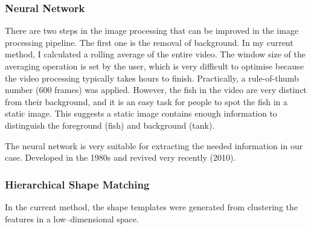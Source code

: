 \documentclass[11pt,twoside]{report}
\begin{document}
\subsubsection{Neural Network}

There are two steps in the image processing that can be improved in the image processing pipeline. The first one is the removal of background. In my current method, I calculated a rolling average of the entire video. The window size of the averaging operation is set by the user, which is very difficult to optimise because the video processing typically takes hours to finish. Practically, a rule-of-thumb number (600 frames) was applied. However, the fish in the video are very distinct from their background, and it is an easy task for people to spot the fish in a static image. This suggests a static image contains enough information to distinguish the foreground (fish) and background (tank). 

The neural network is very suitable for extracting the needed information in our case. Developed in the 1980s and revived very recently (2010).

\subsubsection{Hierarchical Shape Matching}

In the current method, the shape templates were generated from clustering the features in a low--dimensional space.


\printbibliography
\end{document}
